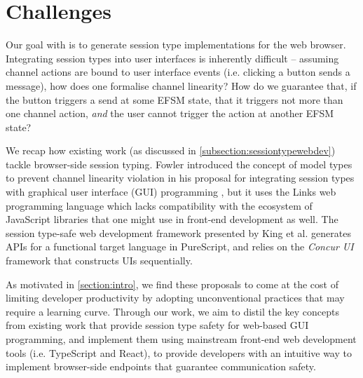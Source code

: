 \section{Challenges}
\label{section:reactchallenges}

Our goal with  is to
generate session type implementations for the web browser.
Integrating session types into user interfaces is inherently difficult --
assuming channel actions are bound to user interface events 
(i.e. clicking a button sends a message), how does one formalise
channel linearity? How do we guarantee that, if the button
triggers a send at some EFSM state, that it triggers not more than
one channel action, \textit{and} the user cannot trigger the action
at another EFSM state?

We recap how existing work 
(as discussed in \cref{subsection:sessiontypewebdev})
tackle browser-side session typing.
Fowler introduced the concept of model types to prevent
channel linearity violation in his proposal for
integrating session types with
graphical user interface (GUI) programming \cite{MVU2020}, but
it uses the Links web programming language \cite{LINKS} which
lacks compatibility with the ecosystem of JavaScript
libraries that one might use in front-end development as well.
The session type-safe web development framework presented
by King et al. \cite{PureScript2019} generates APIs for
a functional target language in PureScript, and relies on
the \textit{Concur UI} framework that constructs UIs sequentially.

As motivated in \cref{section:intro},
we find these proposals to come at the cost of
limiting developer productivity by adopting unconventional practices
that may require a learning curve.
Through our work, we aim to distil the key
concepts from existing work that provide session type safety
for web-based GUI programming, and implement them using
mainstream front-end web development tools (i.e. TypeScript
and React), to provide developers with an intuitive way to implement
browser-side endpoints that guarantee communication safety.